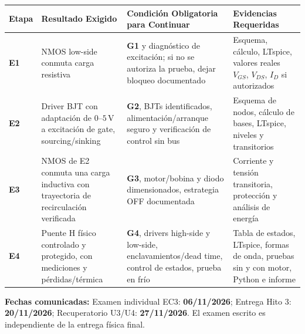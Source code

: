 \documentclass[10pt, a4paper, landscape]{article}
\begin{document}
\par\vspace{0.1cm}\noindent
\renewcommand{\arraystretch}{1.4}
\begin{tabularx}{\linewidth}{|p{1.2cm}|p{6.2cm}|>{\raggedright\arraybackslash}X|>{\raggedright\arraybackslash}p{7.5cm}|}
\hline
\rowcolor{ucbgray}
\textbf{Etapa} & \textbf{Resultado Exigido} & \textbf{Condición Obligatoria para Continuar} & \textbf{Evidencias Requeridas} \\ \hline
\textbf{E1} & NMOS low-side conmuta carga resistiva & \textbf{G1} y diagnóstico de excitación; si no se autoriza la prueba, dejar bloqueo documentado & Esquema, cálculo, LTspice, valores reales $V_{GS}$, $V_{DS}$, $I_D$ si autorizados \\ \hline
\textbf{E2} & Driver BJT con adaptación de $0\text{--}5\,\text{V}$ a excitación de gate, sourcing/sinking & \textbf{G2}, BJTs identificados, alimentación/arranque seguro y verificación de control sin bus & Esquema de nodos, cálculo de bases, LTspice, niveles y transitorios \\ \hline
\textbf{E3} & NMOS de E2 conmuta una carga inductiva con trayectoria de recirculación verificada & \textbf{G3}, motor/bobina y diodo dimensionados, estrategia OFF documentada & Corriente y tensión transitoria, protección y análisis de energía \\ \hline
\textbf{E4} & Puente H físico controlado y protegido, con mediciones y pérdidas/térmica & \textbf{G4}, drivers high-side y low-side, enclavamientos/dead time, control de estados, prueba en frío & Tabla de estados, LTspice, formas de onda, pruebas sin y con motor, Python e informe \\ \hline
\end{tabularx}

\vspace{0.3cm}
\noindent
\textbf{Fechas comunicadas:} Examen individual EC3: \textbf{06/11/2026}; Entrega Hito 3: \textbf{20/11/2026}; Recuperatorio U3/U4: \textbf{27/11/2026}. El examen escrito es independiente de la entrega física final.
\end{document}
